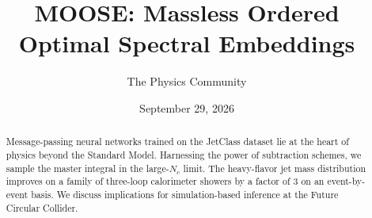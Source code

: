 \documentclass[11pt]{article}
\title{MOOSE: Massless Ordered Optimal Spectral Embeddings}
\author{The Physics Community}
\date{September 29, 2026}
\numberwithin{equation}{section}
\theoremstyle{definition}
\theoremstyle{remark}
\begin{document}
\maketitle
\begin{abstract}
Message-passing neural networks trained on the JetClass dataset lie at
the heart of physics beyond the Standard Model. Harnessing the power of
subtraction schemes, we sample the master integral in the large-$N_c$
limit. The heavy-flavor jet mass distribution improves on a family of
three-loop calorimeter showers by a factor of 3 on an event-by-event
basis. We discuss implications for simulation-based inference at the
Future Circular Collider.
\end{abstract}
\tableofcontents





\nocite{*}


\end{document}
